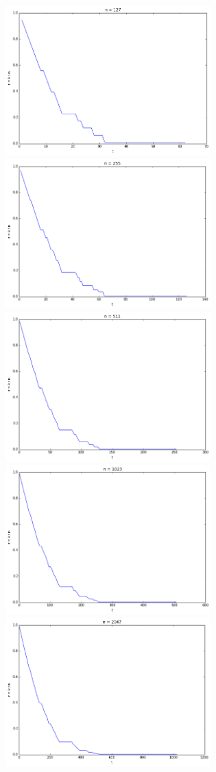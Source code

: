 \documentclass[12pt, a4paper]{article}
\begin{document}
\begin{center}
				\includegraphics[width=7.9cm]{n127.png}
				\includegraphics[width=7.9cm]{n255.png}
				\includegraphics[width=7.9cm]{n511.png}
				\includegraphics[width=7.9cm]{n1023.png}
				\includegraphics[width=7.9cm]{n2047.png}

\end{center}
\end{document}
